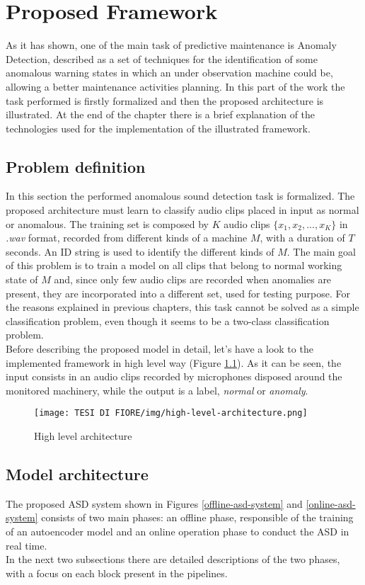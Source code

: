 \chapter{Proposed Framework}
As it has shown, one of the main task of predictive maintenance is Anomaly Detection, described as a set of techniques for the identification of some anomalous warning states in which an under observation machine could be, allowing a better maintenance activities planning. In this part of the work the task performed is firstly formalized and then the proposed architecture is illustrated. At the end of the chapter there is a brief explanation of the technologies used for the implementation of the illustrated framework.
\section{Problem definition}
In this section the performed anomalous sound detection task is formalized. The proposed architecture must learn to classify audio clips placed in input as normal or anomalous. The training set is composed by $K$ audio clips $\{x_1, x_2, ...,x_K\}$ in \textit{.wav} format, recorded from different kinds of a machine $M$, with a duration of $T$ seconds. An ID string is used to identify the different kinds of $M$. The main goal of this problem is to train a model on all clips that belong to normal working state of $M$ and, since only few audio clips are recorded when anomalies are present, they are incorporated into a different set, used for testing purpose. For the reasons explained in previous chapters, this task cannot be solved as a simple classification problem, even though it seems to be a two-class classification problem.\\
Before describing the proposed model in detail, let’s have a look to the implemented framework in high level way (Figure \ref{high-level-architecture}). As it can be seen, the input consists in an audio clips recorded by microphones disposed around the monitored machinery, while the output is a label, \textit{normal} or \textit{anomaly}.
\begin{figure}[ht]
\texttt{[image: TESI DI FIORE/img/high-level-architecture.png]}
\centering
\caption{High level architecture \cite{DCASE}}
\label{high-level-architecture}
\end{figure}

\section{Model architecture}
The proposed ASD system shown in Figures \ref{offline-asd-system} and \ref{online-asd-system} consists of two main phases: an offline phase, responsible of the training of an autoencoder model and an online operation phase to conduct the ASD in real time.\\
In the next two subsections there are detailed descriptions of the two phases, with a focus on each block present in the pipelines.

